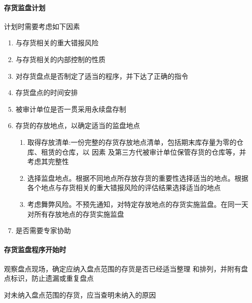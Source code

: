 \documentclass[UTF8,12pt]{ctexart}
\numberwithin{equation}{section} %
\numberwithin{figure}{section}
\numberwithin{table}{section}
\begin{document}
	\paragraph{存货监盘计划}
	计划时需要考虑如下因素
	\begin{enumerate}
		\item 与存货相关的重大错报风险  
		
		\item 与存货相关的内部控制的性质 
		
		\item 对存货盘点是否制定了适当的程序，并下达了正确的指令  
		
		\item 存货盘点的时间安排 
		
		\item 被审计单位是否一贯采用永续盘存制
		
		\item 存货的存放地点，以确定适当的监盘地点
		\begin{enumerate}
			\item 取得存放清单:一份完整的存货存放地点清单，包括期末库存量为零的仓库、租赁的仓库，以 因素 及第三方代被审计单位保管存货的仓库等，并考虑其完整性
			
			\item 选择监盘地点。根据不同地点所存放存货的重要性选择适当的地点。根据各个地点与存货相关的重大错报风险的评估结果选择适当的地点
			
			\item 考虑舞弊风险。不预先通知，对特定存放地点的存货实施监盘。在同一天对所有存放地点的存货实施监盘
		\end{enumerate}
		
		\item 是否需要专家协助
	\end{enumerate}
	
	\paragraph{存货监盘程序开始时}
	观察盘点现场，确定应纳入盘点范围的存货是否已经适当整理 和排列，并附有盘点标识，防止遗漏或重复盘点 
	
	对未纳入盘点范围的存货，应当查明未纳入的原因
	
\end{document}

